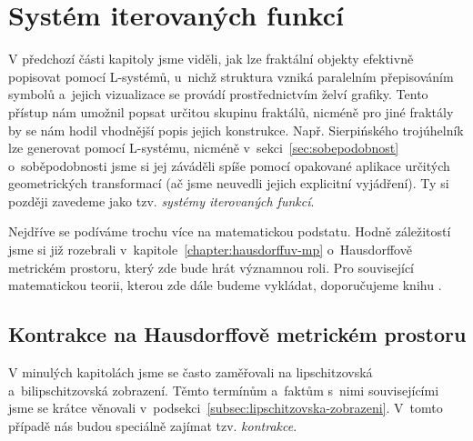 \section{Systém iterovaných funkcí}\label{sec:ifs}

V předchozí části kapitoly jsme viděli, jak lze fraktální objekty efektivně popisovat pomocí L-systémů, u~nichž struktura vzniká paralelním přepisováním symbolů a~jejich vizualizace se provádí prostřednictvím želví grafiky. Tento přístup nám umožnil popsat určitou skupinu fraktálů, nicméně pro jiné fraktály by se nám hodil vhodnější popis jejich konstrukce. Např. Sierpińského trojúhelník lze generovat pomocí L-systému, nicméně v~sekci~\ref{sec:sobepodobnost} o~soběpodobnosti jsme si jej záváděli spíše pomocí opakované aplikace určitých geometrických transformací (ač jsme neuvedli jejich explicitní vyjádření). Ty si později zavedeme jako tzv. \emph{systémy iterovaných funkcí}.

Nejdříve se podíváme trochu více na matematickou podstatu. Hodně záležitostí jsme si již rozebrali v~kapitole~\ref{chapter:hausdorffuv-mp} o~Hausdorffově metrickém prostoru, který zde bude hrát významnou roli. Pro související matematickou teorii, kterou zde dále budeme vykládat, doporučujeme knihu \cite{Barnsley1993}.

\subsection{Kontrakce na Hausdorffově metrickém prostoru}\label{subsec:hausdorffuv-mp-kontrakce}

V minulých kapitolách jsme se často zaměřovali na lipschitzovská a~bilipschitzovská zobrazení. Těmto termínům a~faktům s~nimi souvisejícími jsme se krátce věnovali v~podsekci~\ref{subsec:lipschitzovska-zobrazeni}. V~tomto případě nás budou speciálně zajímat tzv. \emph{kontrakce}.


